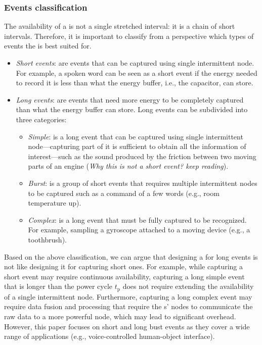 \subsubsection{Events classification}
\label{sec:event_classification}
The availability of a \cis is not a single stretched interval: it is a chain of short intervals. Therefore, it is important to classify from a \cis perspective which types of events the \cis is best suited for. 
%
\begin{itemize}
\item \textit{Short events}: are events that can be captured using single intermittent node. For example, a spoken word can be seen as a short event if the energy needed to record it is less than what the energy buffer, i.e., the capacitor, can store.
\item \textit{Long events}: are events that need more energy to be completely captured than what the energy buffer can store. Long events can be subdivided into three categories: 
	\begin{itemize}
		\item \textit{Simple}: is a long event that can be captured using single intermittent node---capturing part of it is sufficient to obtain all the information of interest---such as the sound produced by the friction between two moving parts of an engine (\textit{Why this is not a short event? keep reading}). 
		\item \textit{Burst}: is a group of short events that requires multiple intermittent nodes to be captured such as a command of a few words (e.g., room temperature up).
		\item \textit{Complex}: is a long event that must be fully captured to be recognized. For example, sampling a gyroscope attached to a moving device (e.g., a toothbrush).

	\end{itemize}
\end{itemize}

Based on the above classification, we can argue that designing a \cis for long events is not like designing it for capturing short ones. For example, while capturing a short event may require continuous \cis availability, capturing a long simple event that is longer than the power cycle $t_\text{p}$ does not require extending the availability of a single intermittent node. Furthermore, capturing a long complex event may require data fusion and processing that require the \cis{}s' nodes to communicate the raw data to a more powerful node, which may lead to significant overhead. However, this paper focuses on short and long bust events as they cover a wide range of applications (e.g., voice-controlled human-object interface). 

